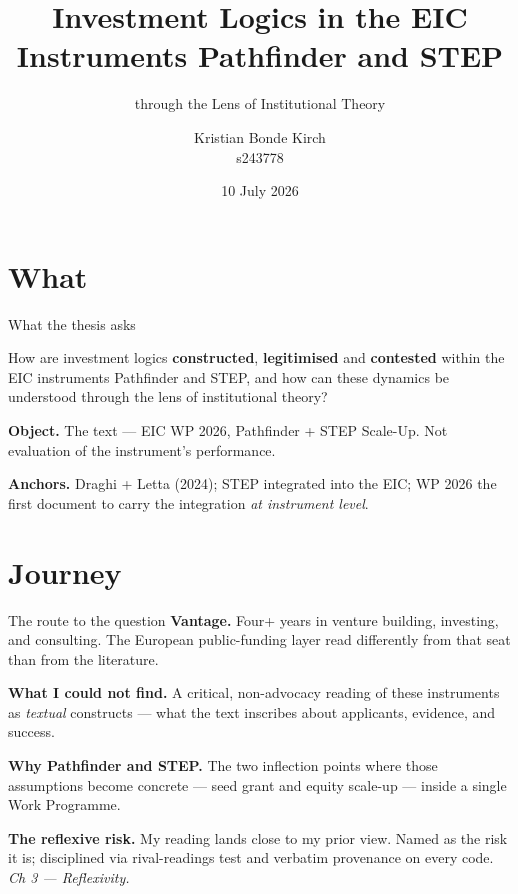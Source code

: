 \documentclass[aspectratio=169,hyperref={pdfpagelabels=false}]{beamer}
\title{Investment Logics in the EIC Instruments Pathfinder and STEP}
\subtitle{through the Lens of Institutional Theory}
\author{Kristian Bonde Kirch \\ \footnotesize s243778}
\date{10 July 2026}
\begin{document}
\inserttitlepage

\section{What}

\begin{frame}{What the thesis asks}
    \begin{block}{}
        How are investment logics \textbf{constructed}, \textbf{legitimised} and \textbf{contested} within the EIC instruments Pathfinder and STEP, and how can these dynamics be understood through the lens of institutional theory?
    \end{block}
    \vspace{4mm}
    \textbf{Object.} The text — EIC WP 2026, Pathfinder + STEP Scale-Up. Not evaluation of the instrument's performance.

    \vspace{3mm}
    \textbf{Anchors.} Draghi + Letta (2024); STEP integrated into the EIC; WP 2026 the first document to carry the integration \emph{at instrument level}.
\end{frame}

\section{Journey}

\begin{frame}{The route to the question}
    \textbf{Vantage.} Four+ years in venture building, investing, and consulting. The European public-funding layer read differently from that seat than from the literature.

    \vspace{3mm}
    \textbf{What I could not find.} A critical, non-advocacy reading of these instruments as \emph{textual} constructs — what the text inscribes about applicants, evidence, and success.

    \vspace{3mm}
    \textbf{Why Pathfinder and STEP.} The two inflection points where those assumptions become concrete — seed grant and equity scale-up — inside a single Work Programme.

    \vspace{4mm}
    \textbf{The reflexive risk.} My reading lands close to my prior view. Named as the risk it is; disciplined via rival-readings test and verbatim provenance on every code. \emph{Ch 3 — Reflexivity.}
\end{frame}
\end{document}
